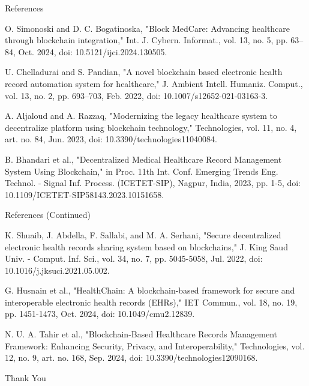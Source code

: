 \documentclass[10pt]{beamer}
\let\oldenumerate\enumerate
\let\endoldenumerate\endenumerate
\renewenvironment{enumerate}
  {\oldenumerate\justifying}
  {\endoldenumerate}
\begin{document}
\begin{frame}{References}
\footnotesize
\begin{enumerate}
\item O. Simonoski and D. C. Bogatinoska, "Block MedCare: Advancing healthcare through blockchain integration," Int. J. Cybern. Informat., vol. 13, no. 5, pp. 63–84, Oct. 2024, doi: 10.5121/ijci.2024.130505.

\item U. Chelladurai and S. Pandian, "A novel blockchain based electronic health record automation system for healthcare," J. Ambient Intell. Humaniz. Comput., vol. 13, no. 2, pp. 693–703, Feb. 2022, doi: 10.1007/s12652-021-03163-3.

\item A. Aljaloud and A. Razzaq, "Modernizing the legacy healthcare system to decentralize platform using blockchain technology," Technologies, vol. 11, no. 4, art. no. 84, Jun. 2023, doi: 10.3390/technologies11040084.

\item B. Bhandari et al., "Decentralized Medical Healthcare Record Management System Using Blockchain," in Proc. 11th Int. Conf. Emerging Trends Eng. Technol. - Signal Inf. Process. (ICETET-SIP), Nagpur, India, 2023, pp. 1-5, doi: 10.1109/ICETET-SIP58143.2023.10151658.
\end{enumerate}
\end{frame}

\begin{frame}{References (Continued)}
\footnotesize
\begin{enumerate}
\setcounter{enumi}{4}
\item K. Shuaib, J. Abdella, F. Sallabi, and M. A. Serhani, "Secure decentralized electronic health records sharing system based on blockchains," J. King Saud Univ. - Comput. Inf. Sci., vol. 34, no. 7, pp. 5045-5058, Jul. 2022, doi: 10.1016/j.jksuci.2021.05.002.

\item G. Husnain et al., "HealthChain: A blockchain-based framework for secure and interoperable electronic health records (EHRs)," IET Commun., vol. 18, no. 19, pp. 1451-1473, Oct. 2024, doi: 10.1049/cmu2.12839.

\item N. U. A. Tahir et al., "Blockchain-Based Healthcare Records Management Framework: Enhancing Security, Privacy, and Interoperability," Technologies, vol. 12, no. 9, art. no. 168, Sep. 2024, doi: 10.3390/technologies12090168.
\end{enumerate}
\end{frame}

\begin{frame}
\begin{center}
\Huge Thank You
\end{center}
\end{frame}
\end{document}
